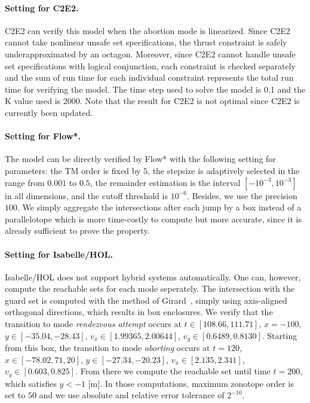 \documentclass[EPiC]{easychair}
\begin{document}
\paragraph{Setting for C2E2.} C2E2 can verify this model when the abortion mode is linearized. Since C2E2 cannot take nonlinear unsafe set specifications, the thrust constraint is safely underapproximated by an octagon. Moreover, since C2E2 cannot handle unsafe set specifications with logical conjunction, each constraint is checked separately and the sum of run time for each individual constraint represents the total run time for verifying the model. The time step used to solve the model is 0.1 and the K value used is 2000. Note that the result for C2E2 is not optimal since C2E2 is currently been updated.

\paragraph{Setting for Flow*.}
The model can be directly verified by Flow* with the following setting for parameters: the TM order is fixed by $5$, the stepsize is adaptively selected in the range from $0.001$ to $0.5$, the remainder estimation is the interval $[-10^{-3},10^{-3}]$ in all dimensions, and the cutoff threshold is $10^{-6}$. Besides, we use the precision $100$. We simply aggregate the intersections after each jump by a box instead of a parallelotope which is more time-costly to compute but more accurate, since it is already sufficient to prove the property.

\paragraph{Setting for Isabelle/HOL.}
Isabelle/HOL does not support hybrid systems automatically.
One can, however, compute the reachable sets for each mode seperately. The intersection with the guard set is computed with the method of Girard~\cite{Girard2008}, simply using axis-aligned orthogonal directions, which results in box enclosures. We verify that the transition to mode \emph{rendezvous attempt} occurs at
$t \in [108.66, 111.71]$,
$x = -100$,
$y \in [-35.04, -28.43]$,
$v_x \in [1.99365, 2.00644]$,
$v_y \in [0.6489, 0.8130]$. Starting from this box, the transition to mode \emph{aborting} occurs at
$t = 120$,
$x \in [-78.02, 71,20]$,
$y \in [-27.34, -20.23]$,
$v_x \in [2.135, 2.341]$,
$v_y \in [0.603, 0.825]$. From there we compute the reachable set until time $t = 200$, which satisfies $y < -1$ [m].
In those computations, maximum zonotope order is set to $50$ and we use absolute and relative error tolerance of $2^{-10}$.
\end{document}
